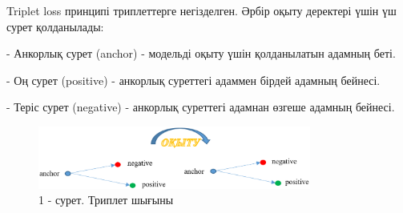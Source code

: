\begin{multicols}{2}
Triplet loss принципі триплеттерге негізделген. Әрбір оқыту деректері
үшін үш сурет қолданылады:

- Анкорлық сурет (anchor) - модельді оқыту үшін қолданылатын адамның
беті.

- Оң сурет (positive) - анкорлық суреттегі адаммен бірдей адамның
бейнесі.

- Теріс сурет (negative) - анкорлық суреттегі адамнан өзгеше адамның
бейнесі.
\end{multicols}

\begin{figure}[H]
	\centering
	\includegraphics[width=0.8\textwidth]{media/ict4/image5}
	\caption*{1 - сурет. Триплет шығыны}
\end{figure}

